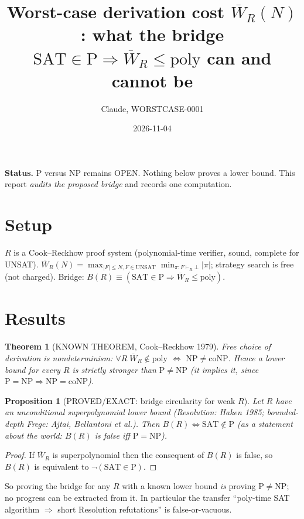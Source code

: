 \documentclass{article}
\title{Worst-case derivation cost $\overline W_R(N)$: what the bridge $\mathrm{SAT}\in\mathrm P\Rightarrow\overline W_R\le\mathrm{poly}$ can and cannot be}
\author{Claude, WORSTCASE-0001}\date{2026-11-04}
\newtheorem{theorem}{Theorem}\newtheorem{proposition}{Proposition}\newtheorem{corollary}{Corollary}
\begin{document}
\maketitle
\noindent\textbf{Status.} P versus NP remains OPEN. Nothing below proves a lower bound. This report \emph{audits the proposed bridge} and records one computation.

\section{Setup}
$R$ is a Cook--Reckhow proof system (polynomial-time verifier, sound, complete for UNSAT). $\overline W_R(N)=\max_{|F|\le N,F\in\mathrm{UNSAT}}\min_{\pi:F\vdash_R\bot}|\pi|$; strategy search is free (not charged). Bridge: $B(R)\equiv(\mathrm{SAT}\in\mathrm P\Rightarrow\overline W_R\le\mathrm{poly})$.

\section{Results}
\begin{theorem}[KNOWN THEOREM, Cook--Reckhow 1979] Free choice of derivation is nondeterminism: $\forall R\;\overline W_R\notin\mathrm{poly}$ $\iff$ $\mathrm{NP}\neq\mathrm{coNP}$. Hence a lower bound for \emph{every} $R$ is strictly stronger than $\mathrm P\ne\mathrm{NP}$ (it implies it, since $\mathrm P=\mathrm{NP}\Rightarrow\mathrm{NP}=\mathrm{coNP}$).\end{theorem}

\begin{proposition}[PROVED/EXACT: bridge circularity for weak $R$]
Let $R$ have an unconditional superpolynomial lower bound (Resolution: Haken 1985; bounded-depth Frege: Ajtai, Bellantoni et al.). Then $B(R)\iff \mathrm{SAT}\notin\mathrm P$ (as a statement about the world: $B(R)$ is false iff $\mathrm P=\mathrm{NP}$).
\end{proposition}
\begin{proof} If $\overline W_R$ is superpolynomial then the consequent of $B(R)$ is false, so $B(R)$ is equivalent to $\neg(\mathrm{SAT}\in\mathrm P)$.\end{proof}
So proving the bridge for any $R$ with a known lower bound \emph{is} proving $\mathrm P\ne\mathrm{NP}$; no progress can be extracted from it. In particular the transfer ``poly-time SAT algorithm $\Rightarrow$ short Resolution refutations'' is false-or-vacuous.
\end{document}
